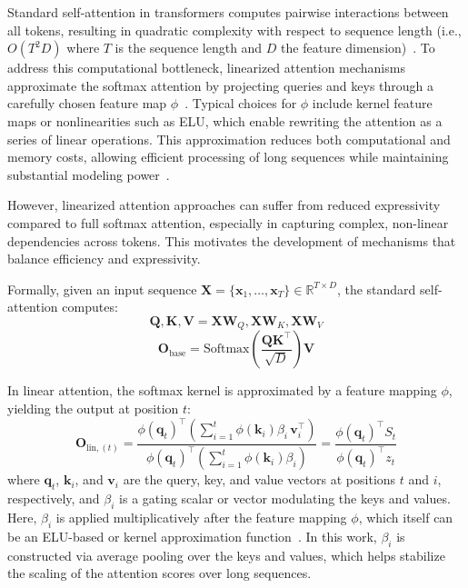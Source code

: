 \documentclass[10pt,a4paper]{article}
\begin{document}
Standard self-attention in transformers computes pairwise interactions between all tokens, resulting in quadratic complexity with respect to sequence length (i.e., $O(T^2 D)$ where $T$ is the sequence length and $D$ the feature dimension)~\cite{vaswani2017attention}. To address this computational bottleneck, linearized attention mechanisms approximate the softmax attention by projecting queries and keys through a carefully chosen feature map $\phi$~\cite{katharopoulos2020transformers, wang2020linformer, mercat2024linearizing, yang2024parallelizing}. Typical choices for $\phi$ include kernel feature maps or nonlinearities such as ELU, which enable rewriting the attention as a series of linear operations. This approximation reduces both computational and memory costs, allowing efficient processing of long sequences while maintaining substantial modeling power~\cite{gu2023mamba, dao2023flashattention, zhang2024lolcats, lan2025liger}.

However, linearized attention approaches can suffer from reduced expressivity compared to full softmax attention, especially in capturing complex, non-linear dependencies across tokens. This motivates the development of mechanisms that balance efficiency and expressivity.

Formally, given an input sequence $\mathbf{X} = \{\mathbf{x}_1, \dots, \mathbf{x}_T\} \in \mathbb{R}^{T \times D}$, the standard self-attention computes:
\begin{equation}
\mathbf{Q}, \mathbf{K}, \mathbf{V} = \mathbf{X}\mathbf{W}_Q, \mathbf{X}\mathbf{W}_K, \mathbf{X}\mathbf{W}_V
\end{equation}
\begin{equation}
\mathbf{O}_{\text{base}} = \text{Softmax}\left(\frac{\mathbf{Q}\mathbf{K}^\top}{\sqrt{D}}\right)\mathbf{V}
\end{equation}

In linear attention, the softmax kernel is approximated by a feature mapping $\phi$, yielding the output at position $t$:
\begin{equation}
\mathbf{O}_{\text{lin}, (t)} = 
\frac{
\phi(\mathbf{q}_t)^\top \left( \sum_{i=1}^t \phi(\mathbf{k}_i) \beta_i\, \mathbf{v}_i^\top \right)}{
\phi(\mathbf{q}_t)^\top \left( \sum_{i=1}^t \phi(\mathbf{k}_i) \beta_i \right)} 
= \frac{\phi(\mathbf{q}_t)^\top S_t}{\phi(\mathbf{q}_t)^\top z_t}
\end{equation}
where $\mathbf{q}_t$, $\mathbf{k}_i$, and $\mathbf{v}_i$ are the query, key, and value vectors at positions $t$ and $i$, respectively, and $\beta_i$ is a gating scalar or vector modulating the keys and values. Here, $\beta_i$ is applied multiplicatively after the feature mapping $\phi$, which itself can be an ELU-based or kernel approximation function~\cite{wang2020linformer}. In this work, $\beta_i$ is constructed via average pooling over the keys and values, which helps stabilize the scaling of the attention scores over long sequences.
\end{document}
